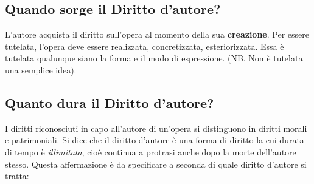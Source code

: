 \subsection{Quando sorge il Diritto d'autore?}
L'autore acquista il diritto sull'opera al momento della sua \textbf{creazione}. \newline
Per essere tutelata, l'opera deve essere realizzata, concretizzata, esteriorizzata. Essa è tutelata
qualunque siano la forma e il modo di espressione. (NB. Non è tutelata una semplice idea).

\subsection{Quanto dura il Diritto d'autore?}
I diritti riconosciuti in capo all'autore di un'opera si distinguono in diritti morali e patrimoniali. \newline
Si dice che il diritto d'autore è una forma di diritto la cui durata di tempo è
\emph{illimitata}, cioè continua a protrasi anche dopo la morte dell'autore stesso. Questa affermazione è da specificare
a seconda di quale diritto d'autore si tratta:
